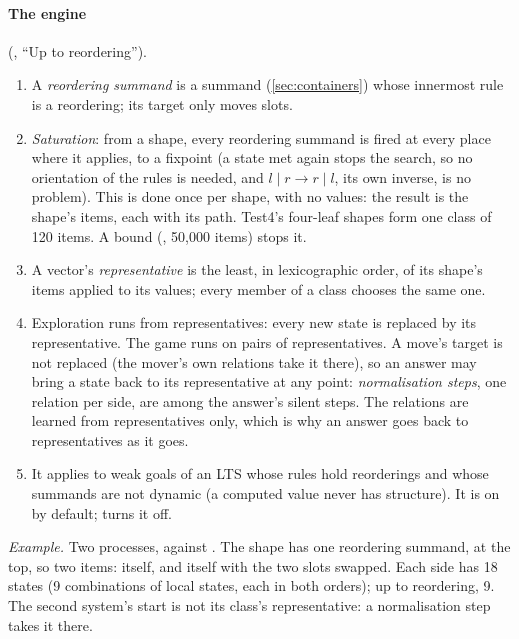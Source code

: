 \paragraph{The engine} (, ``Up to reordering'').
\begin{enumerate}
\item A \emph{reordering summand} is a summand (\cref{sec:containers})
  whose innermost rule is a reordering; its target only moves slots.
\item \emph{Saturation}: from a shape, every reordering summand is fired
  at every place where it applies, to a fixpoint (a state met again stops
  the search, so no orientation of the rules is needed, and
  $l \mid r \to r \mid l$, its own inverse, is no problem). This is done
  once per shape, with no values: the result is the shape's items, each
  with its path. Test4's four-leaf shapes form one class of 120 items.
  A bound (, 50,000 items) stops it.
\item A vector's \emph{representative} is the least, in lexicographic
  order, of its shape's items applied to its values; every member of a
  class chooses the same one.
\item Exploration runs from representatives: every new state is replaced
  by its representative. The game runs on pairs of representatives. A
  move's target is not replaced (the mover's own relations take it
  there), so an answer may bring a state back to its representative at
  any point: \emph{normalisation steps}, one relation per side, are among
  the answer's silent steps. The relations are learned from
  representatives only, which is why an answer goes back to
  representatives as it goes.
\item It applies to weak goals of an LTS whose rules hold reorderings
  and whose summands are not dynamic (a computed value never has
  structure). It is on by default;  turns it off.
\end{enumerate}

\emph{Example.} Two processes,  against
. The shape  has one reordering summand,  at the top, so two items:
itself, and itself with the two slots swapped. Each side has 18 states
(9 combinations of local states, each in both orders); up to reordering,
9. The second system's start is not its class's representative: a
normalisation step takes it there.

